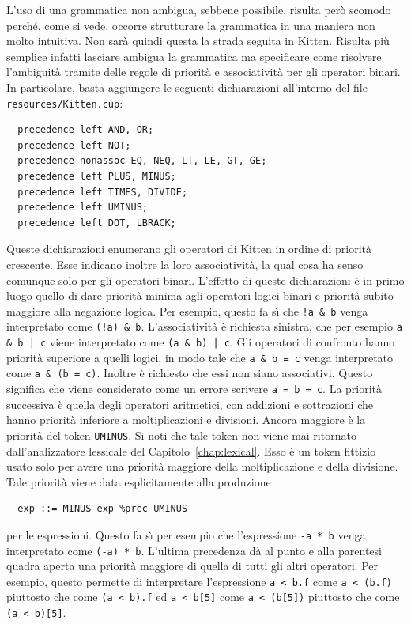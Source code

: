 L'uso di una grammatica non ambigua, sebbene possibile, risulta per\`o
scomodo perch\'e, come si vede, occorre strutturare la grammatica in una
maniera non molto intuitiva. Non sar\`a quindi questa la strada seguita
in Kitten. Risulta pi\`u semplice infatti lasciare ambigua la grammatica
ma specificare come risolvere l'ambiguit\`a tramite delle regole
di priorit\`a e associativit\`a per gli operatori binari.
In particolare, basta aggiungere le seguenti dichiarazioni all'interno del
file \texttt{resources/Kitten.cup}:
%
\begin{verbatim}
  precedence left AND, OR;
  precedence left NOT;
  precedence nonassoc EQ, NEQ, LT, LE, GT, GE;
  precedence left PLUS, MINUS;
  precedence left TIMES, DIVIDE;
  precedence left UMINUS;
  precedence left DOT, LBRACK;
\end{verbatim}
%
Queste dichiarazioni enumerano gli operatori di Kitten in ordine di
priorit\`a crescente. Esse indicano inoltre la loro associativit\`a,
la qual cosa ha senso comunque solo per gli operatori binari.
L'effetto di queste dichiarazioni \`e in primo luogo quello di dare priorit\`a
minima agli operatori logici binari e priorit\`a subito maggiore alla
negazione logica. Per esempio, questo fa s\`{\i} che
\texttt{!a \& b} venga interpretato come \texttt{(!a) \& b}.
L'associativit\`a \`e richiesta sinistra, \cosi che per esempio
\texttt{a \& b | c} viene interpretato come \texttt{(a \& b) | c}.
Gli operatori di confronto hanno priorit\`a superiore a quelli
logici, in modo tale che \texttt{a \& b = c} venga interpretato come
\texttt{a \& (b = c)}. Inoltre \`e richiesto che essi non siano
associativi. Questo significa che viene considerato come un errore
scrivere \texttt{a = b = c}. La priorit\`a successiva \`e quella
degli operatori aritmetici, con addizioni e sottrazioni che hanno
priorit\`a inferiore a moltiplicazioni e divisioni. Ancora maggiore
\`e la priorit\`a del token \texttt{UMINUS}. Si noti che tale token non
viene mai ritornato dall'analizzatore lessicale del
Capitolo~\ref{chap:lexical}. Esso \`e un token
fittizio usato solo per avere una priorit\`a maggiore della moltiplicazione
e della divisione. Tale priorit\`a viene data esplicitamente alla produzione
%
\begin{verbatim}
  exp ::= MINUS exp %prec UMINUS
\end{verbatim}
%
per le espressioni. Questo fa s\`{\i} per esempio che l'espressione
\texttt{-a * b} venga interpretato come \texttt{(-a) * b}.
%
L'ultima precedenza d\`a al punto e alla parentesi quadra
aperta una priorit\`a maggiore
di quella di tutti gli altri operatori. Per esempio, questo permette
di interpretare l'espressione
\texttt{a < b.f} come \texttt{a < (b.f)} piuttosto che
come \texttt{(a < b).f} ed \texttt{a < b[5]} come \texttt{a < (b[5])}
piuttosto che come \texttt{(a < b)[5]}.


